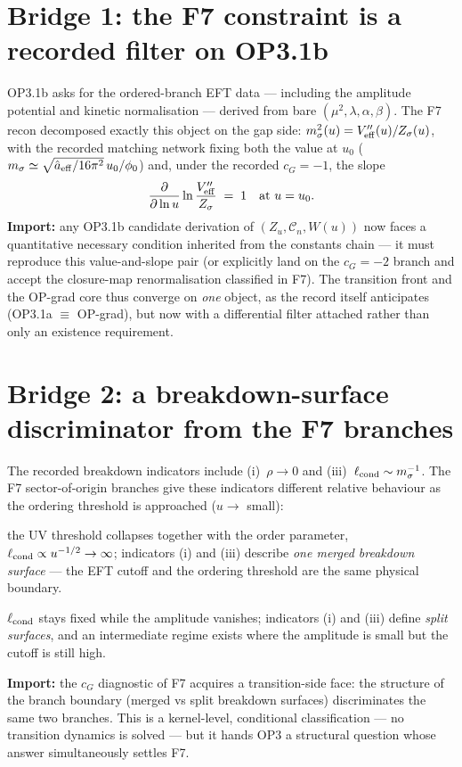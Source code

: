 \documentclass[11pt,a4paper]{article}
\begin{document}
\section{Bridge 1: the F7 constraint is a recorded filter on OP3.1b}
OP3.1b asks for the ordered-branch EFT data --- including the amplitude
potential and kinetic normalisation --- derived from bare
$(\mu^2,\lambda,\alpha,\beta)$. The F7 recon decomposed exactly this object
on the gap side: $m_\sigma^2(u)=V''_{\rm eff}(u)/Z_\sigma(u)$, with the
recorded matching network fixing both the value at $u_0$
($m_\sigma\simeq\sqrt{\hat a_{\rm eff}/16\pi^2}\,u_0/\phi_0$) and, under the
recorded $c_G=-1$, the slope
\[
\frac{\partial}{\partial\ln u}\ln\frac{V''_{\rm eff}}{Z_\sigma}\;=\;1
\quad\text{at }u=u_0.
\]
\textbf{Import:} any OP3.1b candidate derivation of
$(Z_u,\mathcal C_n,W(u))$ now faces a quantitative necessary condition
inherited from the constants chain --- it must reproduce this value-and-slope
pair (or explicitly land on the $c_G=-2$ branch and accept the
closure-map renormalisation classified in F7). The transition front and the
OP-grad core thus converge on \emph{one} object, as the record itself
anticipates (OP3.1a $\equiv$ OP-grad), but now with a differential filter
attached rather than only an existence requirement.

\section{Bridge 2: a breakdown-surface discriminator from the F7 branches}
The recorded breakdown indicators include (i)~$\rho\to0$ and
(iii)~$\ell_{\rm cond}\sim m_\sigma^{-1}$. The F7 sector-of-origin branches
give these indicators different relative behaviour as the ordering
threshold is approached ($u\to$ small):
\begin{description}[leftmargin=2.0em,itemsep=2pt]
\item[Gradient-native ($m_\sigma^2=c\,u$, $c_G=-1$):] the UV threshold
collapses together with the order parameter, $\ell_{\rm cond}\propto
u^{-1/2}\to\infty$; indicators (i) and (iii) describe \emph{one
merged breakdown surface} --- the EFT cutoff and the ordering threshold
are the same physical boundary.
\item[Potential-imported (pinned $m_\sigma$, $c_G=-2$):] $\ell_{\rm cond}$
stays fixed while the amplitude vanishes; indicators (i) and (iii) define
\emph{split surfaces}, and an intermediate regime exists where the
amplitude is small but the cutoff is still high.
\end{description}
\textbf{Import:} the $c_G$ diagnostic of F7 acquires a transition-side
face: the structure of the branch boundary (merged vs split breakdown
surfaces) discriminates the same two branches. This is a kernel-level,
conditional classification --- no transition dynamics is solved --- but it
hands OP3 a structural question whose answer simultaneously settles F7.
\end{document}
